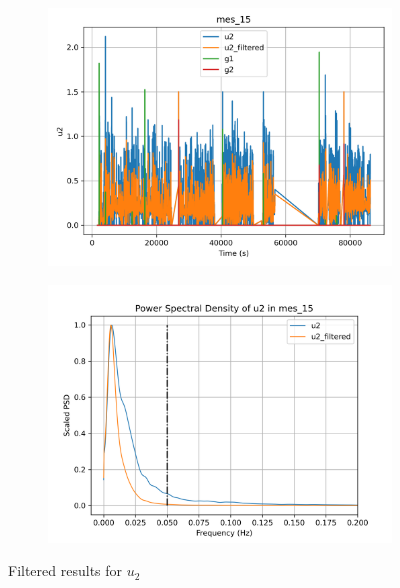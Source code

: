 \begin{figure}[H]

\begin{minipage}{0.49\textwidth}
        \begin{figure}[H]
                \centering
                \includegraphics[width = \textwidth]{./figs/trk_filt/mes_15/u2.png}
        \end{figure}
\end{minipage}
\begin{minipage}{0.49\textwidth}
        \begin{figure}[H]
                \centering
                \includegraphics[width = \textwidth]{./figs/trk_filt/mes_15/u2_psd.png}
        \end{figure}
\end{minipage}
\caption{Filtered results for $u_2$}

\end{figure}



